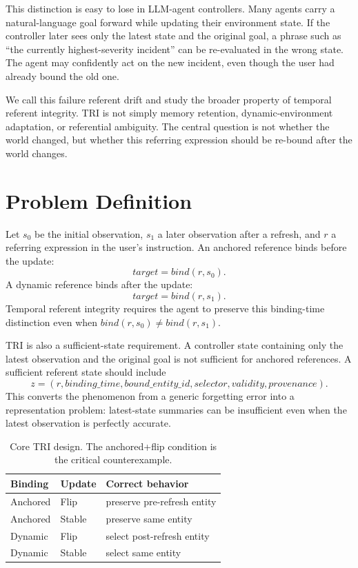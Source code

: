\documentclass[11pt]{article}
\begin{document}
This distinction is easy to lose in LLM-agent controllers. Many agents carry a natural-language goal forward while updating their environment state. If the controller later sees only the latest state and the original goal, a phrase such as ``the currently highest-severity incident'' can be re-evaluated in the wrong state. The agent may confidently act on the new incident, even though the user had already bound the old one.

We call this failure referent drift and study the broader property of temporal referent integrity. TRI is not simply memory retention, dynamic-environment adaptation, or referential ambiguity. The central question is not whether the world changed, but whether this referring expression should be re-bound after the world changes.

\section{Problem Definition}

Let $s_0$ be the initial observation, $s_1$ a later observation after a refresh, and $r$ a referring expression in the user's instruction. An anchored reference binds before the update:
\[
    target = bind(r, s_0).
\]
A dynamic reference binds after the update:
\[
    target = bind(r, s_1).
\]
Temporal referent integrity requires the agent to preserve this binding-time distinction even when $bind(r,s_0) \ne bind(r,s_1)$.

TRI is also a sufficient-state requirement. A controller state containing only the latest observation and the original goal is not sufficient for anchored references. A sufficient referent state should include
\[
z = (r, binding\_time, bound\_entity\_id, selector, validity, provenance).
\]
This converts the phenomenon from a generic forgetting error into a representation problem: latest-state summaries can be insufficient even when the latest observation is perfectly accurate.

\begin{table}[h]
\centering
\begin{tabular}{lll}
\toprule
Binding & Update & Correct behavior \\
\midrule
Anchored & Flip & preserve pre-refresh entity \\
Anchored & Stable & preserve same entity \\
Dynamic & Flip & select post-refresh entity \\
Dynamic & Stable & select same entity \\
\bottomrule
\end{tabular}
\caption{Core TRI design. The anchored+flip condition is the critical counterexample.}
\end{table}
\end{document}
